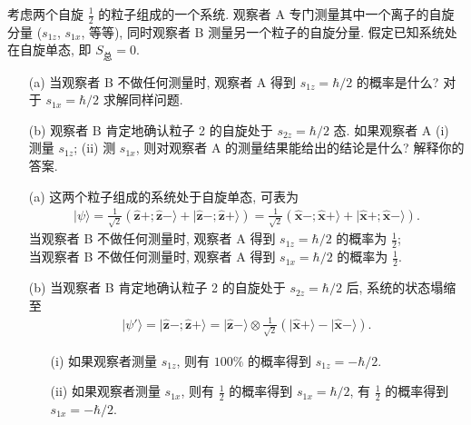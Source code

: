 \documentclass{assignment}
\begin{document}
\begin{prob}[课本习题 3.28]
    考虑两个自旋 $\frac{1}{2}$ 的粒子组成的一个系统. 观察者 A 专门测量其中一个离子的自旋分量 ($s_{1z}$, $s_{1x}$, 等等), 同时观察者 B 测量另一个粒子的自旋分量. 假定已知系统处在自旋单态, 即 $S_{\text{总}}=0$.
    \begin{itemize}
        \item[(a)] 当观察者 B 不做任何测量时, 观察者 A 得到 $s_{1z}=\hbar/2$ 的概率是什么? 对于 $s_{1x}=\hbar/2$ 求解同样问题.
        \item[(b)] 观察者 B 肯定地确认粒子 2 的自旋处于 $s_{2z}=\hbar/2$ 态. 如果观察者 A (i) 测量 $s_{1z}$; (ii) 测 $s_{1x}$, 则对观察者 A 的测量结果能给出的结论是什么? 解释你的答案.
    \end{itemize}
\end{prob}
\begin{sol}
    \begin{itemize}
        \item[(a)] 这两个粒子组成的系统处于自旋单态, 可表为
        \begin{align}
            \lvert\psi\rangle=\frac{1}{\sqrt{2}}(\hat{\bm{z}}+;\hat{\bm{z}}-\rangle+\lvert\hat{\bm{z}}-;\hat{\bm{z}}+\rangle)=\frac{1}{\sqrt{2}}(\hat{\bm{x}}-;\hat{\bm{x}}+\rangle+\lvert\hat{\bm{x}}+;\hat{\bm{x}}-\rangle).
        \end{align}
        当观察者 B 不做任何测量时, 观察者 A 得到 $s_{1z}=\hbar/2$ 的概率为 $\frac{1}{2}$;\\
        当观察者 B 不做任何测量时, 观察者 A 得到 $s_{1x}=\hbar/2$ 的概率为 $\frac{1}{2}$.
        \item[(b)] 当观察者 B 肯定地确认粒子 2 的自旋处于 $s_{2z}=\hbar/2$ 后, 系统的状态塌缩至
        \begin{align}
            \lvert\psi'\rangle=\lvert\hat{\bm{z}}-;\hat{\bm{z}}+\rangle=\lvert\hat{\bm{z}}-\rangle\otimes\frac{1}{\sqrt{2}}(\lvert\hat{\bm{x}}+\rangle-\lvert\hat{\bm{x}}-\rangle).
        \end{align}
        \begin{itemize}
            \item[(i)] 如果观察者测量 $s_{1z}$, 则有 $100\%$ 的概率得到 $s_{1z}=-\hbar/2$.
            \item[(ii)] 如果观察者测量 $s_{1x}$, 则有 $\frac{1}{2}$ 的概率得到 $s_{1x}=\hbar/2$, 有 $\frac{1}{2}$ 的概率得到 $s_{1x}=-\hbar/2$.
        \end{itemize}
    \end{itemize}
\end{sol}
\end{document}
